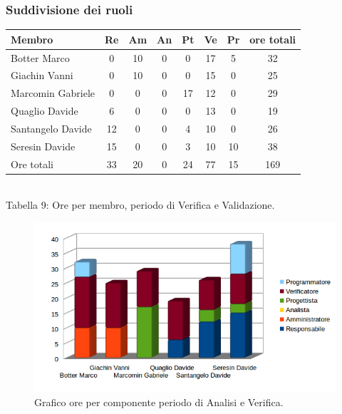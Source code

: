 \subsubsection{Suddivisione dei ruoli}
\begin{center}
\begin{tabular}{| l | c | c | c | c | c | c | c |}
\hline
Membro & Re & Am & An & Pt & Ve & Pr & ore totali \\
\hline
Botter Marco & 0 & 10 & 0 & 0 & 17 & 5 & 32 \\

Giachin Vanni & 0 & 10 & 0 & 0 & 15 & 0 & 25 \\

Marcomin Gabriele & 0 & 0 & 0 & 17 & 12 & 0 & 29 \\

Quaglio Davide & 6 & 0 & 0 & 0 & 13 & 0 & 19 \\

Santangelo Davide & 12 & 0 & 0 & 4 & 10 & 0 & 26 \\

Seresin Davide & 15 & 0 & 0 & 3 & 10 & 10 & 38 \\
\hline
Ore totali & 33 & 20 & 0 & 24 & 77 & 15 & 169\\
\hline
\end{tabular}
\\
Tabella 9: Ore per membro, periodo di Verifica e Validazione.
\end{center}
\begin{figure}[H] \centering \includegraphics[width=%
\textwidth]
{../modello/img/4.png} \caption{ Grafico ore per componente periodo di Analisi e Verifica.}
\end{figure}
